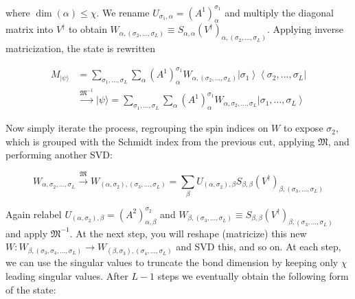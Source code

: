 \documentclass[12pt]{article}
\begin{document}
where $\operatorname{dim}(\alpha) \leq \chi$. We rename $U_{\sigma_{1}, \alpha}=\left(A^{1}\right)_{\alpha}^{\sigma_{1}}$ and multiply the diagonal matrix into $V^{\dagger}$ to obtain $W_{\alpha,\left(\sigma_{2}, \ldots, \sigma_{L}\right)} \equiv S_{\alpha, \alpha}\left(V^{\dagger}\right)_{\alpha,\left(\sigma_{2}, \ldots, \sigma_{L}\right)}$. Applying inverse matricization, the state is rewritten


\begin{align*}
M_{|\psi\rangle} & =\sum_{\sigma_{1}, \ldots, \sigma_{L}} \sum_{\alpha}\left(A^{1}\right)_{\alpha}^{\sigma_{1}} W_{\alpha,\left(\sigma_{2}, \ldots, \sigma_{L}\right)}\left|\sigma_{1}\right\rangle\left\langle\sigma_{2}, \ldots, \sigma_{L}\right|  \tag{13}\\
& \xrightarrow{\mathfrak{M}^{-1}}|\psi\rangle=\sum_{\sigma_{1}, \ldots, \sigma_{L}} \sum_{\alpha}\left(A^{1}\right)_{\alpha}^{\sigma_{1}} W_{\alpha, \sigma_{2}, \ldots, \sigma_{L}}\left|\sigma_{1}, \ldots, \sigma_{L}\right\rangle \tag{14}
\end{align*}


Now simply iterate the process, regrouping the spin indices on $W$ to expose $\sigma_{2}$, which is grouped with the Schmidt index from the previous cut, applying $\mathfrak{M}$, and performing another SVD:


\begin{equation*}
W_{\alpha, \sigma_{2}, \ldots, \sigma_{L}} \xrightarrow{\mathfrak{M}} W_{\left(\alpha, \sigma_{2}\right),\left(\sigma_{3}, \ldots, \sigma_{L}\right)}=\sum_{\beta} U_{\left(\alpha, \sigma_{2}\right), \beta} S_{\beta, \beta}\left(V^{\dagger}\right)_{\beta,\left(\sigma_{3}, \ldots, \sigma_{L}\right)} \tag{15}
\end{equation*}


Again relabel $U_{\left(\alpha, \sigma_{2}\right), \beta}=\left(A^{2}\right)_{\alpha, \beta}^{\sigma_{2}}$ and $W_{\beta,\left(\sigma_{3}, \ldots, \sigma_{L}\right)} \equiv S_{\beta, \beta}\left(V^{\dagger}\right)_{\beta,\left(\sigma_{3}, \ldots, \sigma_{L}\right)}$ and apply $\mathfrak{M}^{-1}$. At the next step, you will reshape (matricize) this new $W: W_{\beta,\left(\sigma_{3}, \sigma_{4}, \ldots, \sigma_{L}\right)} \rightarrow W_{\left(\beta, \sigma_{3}\right),\left(\sigma_{4}, \ldots, \sigma_{L}\right)}$ and SVD this, and so on. At each step, we can use the singular values to truncate the bond dimension by keeping only $\chi$ leading singular values. After $L-1$ steps we eventually obtain the following form of the state:
\end{document}
